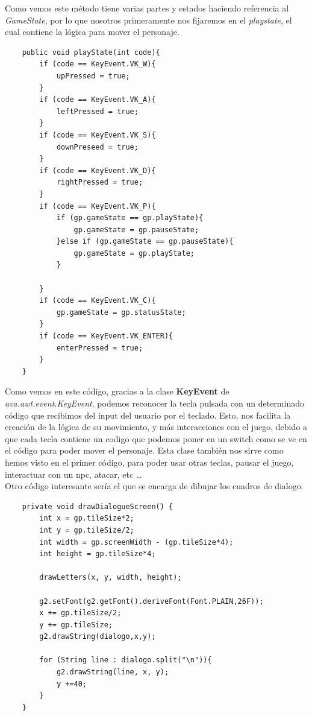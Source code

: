 \documentclass[a4paper]{article}
\begin{document}
Como vemos este método tiene varias partes y estados haciendo referencia al \textit{GameState}, por lo que nosotros primeramente nos fijaremos en el \textit{playstate}, el cual contiene la lógica para mover el personaje.
\begin{lstlisting}
    public void playState(int code){
        if (code == KeyEvent.VK_W){
            upPressed = true;
        }
        if (code == KeyEvent.VK_A){
            leftPressed = true;
        }
        if (code == KeyEvent.VK_S){
            downPreseed = true;
        }
        if (code == KeyEvent.VK_D){
            rightPressed = true;
        }
        if (code == KeyEvent.VK_P){
            if (gp.gameState == gp.playState){
                gp.gameState = gp.pauseState;
            }else if (gp.gameState == gp.pauseState){
                gp.gameState = gp.playState;
            }

        }
        if (code == KeyEvent.VK_C){
            gp.gameState = gp.statusState;
        }
        if (code == KeyEvent.VK_ENTER){
            enterPressed = true;
        }
    }
\end{lstlisting}
Como vemos en este código, gracias a la clase \textbf{KeyEvent} de \textit{ava.awt.event.KeyEvent}, podemos reconocer la tecla pulsada con un determinado código que recibimos del input del usuario por el teclado. Esto, 
nos facilita la creación de la lógica de su movimiento, y más interacciones con el juego, debido a que cada tecla contiene un codigo que podemos poner en un switch como se ve en el código para poder mover el personaje.
Esta clase también nos sirve como hemos visto en el primer código, para poder usar otras teclas, pausar el juego, interactuar con un npc, atacar, etc \dots \\
Otro código interesante sería el que se encarga de dibujar los cuadros de dialogo.
\begin{lstlisting}
    private void drawDialogueScreen() {
        int x = gp.tileSize*2;
        int y = gp.tileSize/2;
        int width = gp.screenWidth - (gp.tileSize*4);
        int height = gp.tileSize*4;

        drawLetters(x, y, width, height);

        g2.setFont(g2.getFont().deriveFont(Font.PLAIN,26F));
        x += gp.tileSize/2;
        y += gp.tileSize;
        g2.drawString(dialogo,x,y);

        for (String line : dialogo.split("\n")){
            g2.drawString(line, x, y);
            y +=40;
        }
    }
\end{lstlisting}
\end{document}
